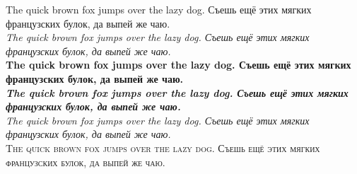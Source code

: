 \documentclass{article}
\begin{document}
\noindent
\textrm{The quick brown fox jumps over the lazy dog. Съешь ещё этих мягких французских булок, да выпей же чаю.}\\
\textit{The quick brown fox jumps over the lazy dog. Съешь ещё этих мягких французских булок, да выпей же чаю.}\\
\textbf{The quick brown fox jumps over the lazy dog. Съешь ещё этих мягких французских булок, да выпей же чаю.}\\
\textbf{\textit{The quick brown fox jumps over the lazy dog. Съешь ещё этих мягких французских булок, да выпей же чаю.}}\\
\textsl{The quick brown fox jumps over the lazy dog. Съешь ещё этих мягких французских булок, да выпей же чаю.}\\
\textsc{The quick brown fox jumps over the lazy dog. Съешь ещё этих мягких французских булок, да выпей же чаю.}
\end{document}
